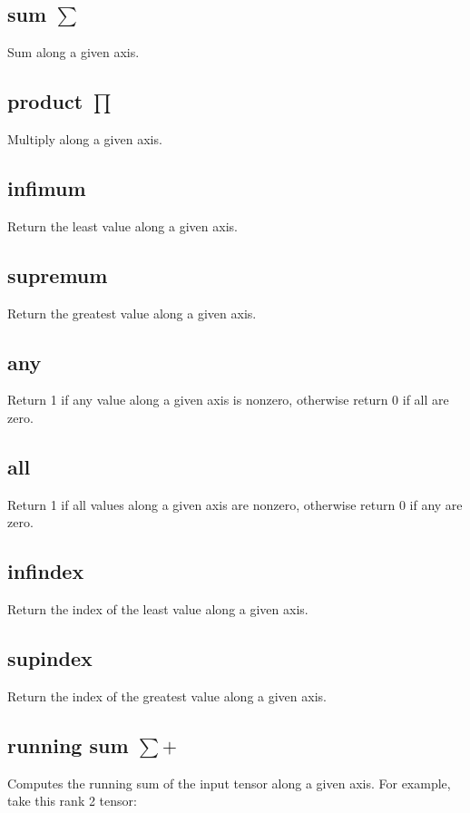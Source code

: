 \subsection{sum $\sum$}\label{Operation:sum} Sum along a given
axis. 

\subsection{product $\prod$}\label{Operation:product} Multiply along a given axis. 

\subsection{infimum}\label{Operation:infimum} Return the least value
along a given axis. 

\subsection{supremum}\label{Operation:supremum} Return the greatest value
along a given axis. 

\subsection{any}\label{Operation:any} Return 1 if any value
along a given axis is nonzero, otherwise return 0 if all are zero. 

\subsection{all}\label{Operation:all} Return 1 if all values
along a given axis are nonzero, otherwise return 0 if any are zero. 

\subsection{infindex}\label{Operation:infIndex} Return the index of
the least value along a given axis.

\subsection{supindex}\label{Operation:supIndex} Return the index of
the greatest value along a given axis.

\subsection{running sum $\sum+$}\label{Operation:runningSum} Computes
the running sum of the input tensor along a given axis. For example, take
this rank 2 tensor:

